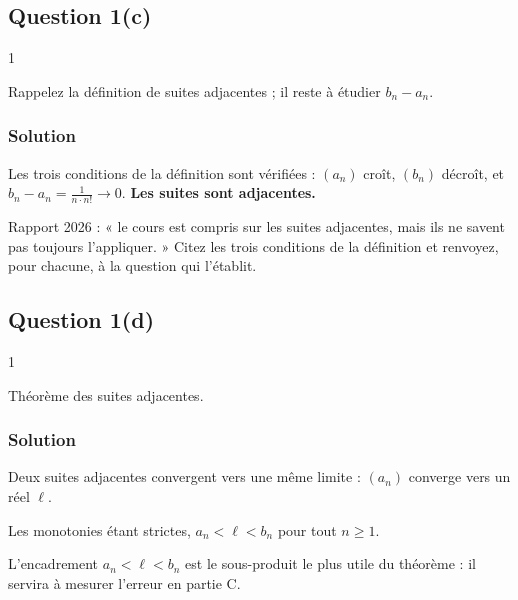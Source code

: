 \documentclass[11pt,a4paper]{article}
\begin{document}
\hypertarget{question-1c}{%
\subsection{Question 1(c)}\label{question-1c}}

\begin{indication}{1}

Rappelez la définition de suites adjacentes ; il reste à étudier \(b_n-a_n\).

\end{indication}

\hypertarget{solution-61}{%
\subsubsection{Solution}\label{solution-61}}

Les trois conditions de la définition sont vérifiées : \((a_n)\) croît, \((b_n)\) décroît, et \(b_n-a_n=\frac1{n\cdot n!}\to0\). \textbf{Les suites sont adjacentes.}

\begin{jury}

Rapport 2026 : « le cours est compris sur les suites adjacentes, mais ils ne savent pas toujours l'appliquer. » Citez les trois conditions de la définition et renvoyez, pour chacune, à la question qui l'établit.

\end{jury}

\hypertarget{question-1d}{%
\subsection{Question 1(d)}\label{question-1d}}

\begin{indication}{1}

Théorème des suites adjacentes.

\end{indication}

\hypertarget{solution-62}{%
\subsubsection{Solution}\label{solution-62}}

Deux suites adjacentes convergent vers une même limite : \((a_n)\) converge vers un réel \(\ell\).

Les monotonies étant strictes, \(a_n<\ell<b_n\) pour tout \(n\ge1\).

\begin{methode}

L'encadrement \(a_n<\ell<b_n\) est le sous-produit le plus utile du théorème : il servira à mesurer l'erreur en partie C.

\end{methode}
\end{document}
